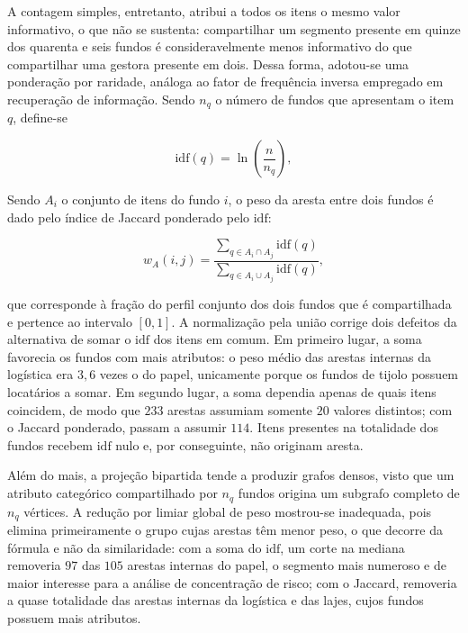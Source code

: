 A contagem simples, entretanto, atribui a todos os itens o mesmo valor
informativo, o que não se sustenta: compartilhar um segmento presente em
quinze dos quarenta e seis fundos é consideravelmente menos informativo do que
compartilhar uma gestora presente em dois. Dessa forma, adotou-se uma
ponderação por raridade, análoga ao fator de frequência inversa empregado em
recuperação de informação. Sendo $n_q$ o número de fundos que apresentam o
item $q$, define-se

\begin{equation}
  \mathrm{idf}(q) = \ln\!\left(\frac{n}{n_q}\right),
\end{equation}

Sendo $A_i$ o conjunto de itens do fundo $i$, o peso da aresta entre dois
fundos é dado pelo índice de Jaccard ponderado pelo $\mathrm{idf}$:

\begin{equation}
  w_A(i,j) = \frac{\sum_{q \in A_i \cap A_j} \mathrm{idf}(q)}
                  {\sum_{q \in A_i \cup A_j} \mathrm{idf}(q)},
\end{equation}

que corresponde à fração do perfil conjunto dos dois fundos que é
compartilhada e pertence ao intervalo $[0,1]$. A normalização pela união
corrige dois defeitos da alternativa de somar o $\mathrm{idf}$ dos itens em
comum. Em primeiro lugar, a soma favorecia os fundos com mais atributos: o
peso médio das arestas internas da logística era $3{,}6$ vezes o do papel,
unicamente porque os fundos de tijolo possuem locatários a somar. Em segundo
lugar, a soma dependia apenas de quais itens coincidem, de modo que $233$
arestas assumiam somente $20$ valores distintos; com o Jaccard ponderado,
passam a assumir $114$. Itens presentes na totalidade dos fundos recebem
$\mathrm{idf}$ nulo e, por conseguinte, não originam aresta.

Além do mais, a projeção bipartida tende a produzir grafos densos, visto que
um atributo categórico compartilhado por $n_q$ fundos origina um subgrafo
completo de $n_q$ vértices. A redução por limiar global de peso mostrou-se
inadequada, pois elimina primeiramente o grupo cujas arestas têm menor peso,
o que decorre da fórmula e não da similaridade: com a soma do $\mathrm{idf}$,
um corte na mediana removeria $97$ das $105$ arestas internas do papel, o
segmento mais numeroso e de maior interesse para a análise de concentração de
risco; com o Jaccard, removeria a quase totalidade das arestas internas da
logística e das lajes, cujos fundos possuem mais atributos.


